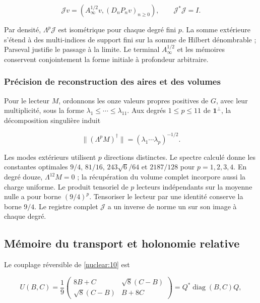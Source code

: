 \[
\mathcal Jv=(A_\infty^{1/2}v,(D_nP_nv)_{n\ge0}),
\qquad \mathcal J^*\mathcal J=I.
\]



Par densité, \(\Lambda^p\mathcal J\) est isométrique pour chaque
degré fini \(p\).
La somme extérieure s’étend à des multi-indices de support fini
sur la somme de Hilbert dénombrable ; Parseval justifie le passage
à la limite.
Le terminal \(A_\infty^{1/2}\) et les mémoires conservent
conjointement la forme initiale à profondeur arbitraire.


\subsubsection{Précision de reconstruction des aires et des volumes}

Pour le lecteur \(M\), ordonnons les onze valeurs propres
positives de \(G\), avec leur multiplicité, sous la forme
\(\lambda_1\le\cdots\le\lambda_{11}\).
Aux degrés \(1\le p\le11\) de \(\mathbf1^\perp\),
la décomposition singulière induit



\begin{equation}
\|(\Lambda^pM)^\dagger\|
=(\lambda_1\cdots\lambda_p)^{-1/2}.
\label{nuc11:eq:24}
\end{equation}



Les modes extérieurs utilisent \(p\) directions distinctes.
Le spectre calculé donne les constantes optimales
\(9/4\), \(81/16\), \(243\sqrt6/64\) et \(2187/128\)
pour \(p=1,2,3,4\).
En degré douze, \(\Lambda^{12}M=0\) ; la récupération du volume
complet incorpore aussi la charge uniforme.
Le produit tensoriel de \(p\) lecteurs indépendants sur
la moyenne nulle a pour borne \((9/4)^p\).
Tensoriser le lecteur par une identité conserve la borne \(9/4\).
Le registre complet \(\mathcal J\) a un inverse de norme un
sur son image à chaque degré.

\subsection{Mémoire du transport et holonomie relative}

Le couplage réversible de \cref{nuclear:10} est



\[
U(B,C)=\frac19
\begin{pmatrix}8B+C&\sqrt8(C-B)\\
\sqrt8(C-B)&B+8C\end{pmatrix}
=Q^*\operatorname{diag}(B,C)Q,
\]



